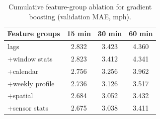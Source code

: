 \begin{table}[t]
\centering
\caption{Cumulative feature-group ablation for gradient boosting (validation MAE, mph).}
\label{tab:feat_ablation}
\begin{tabular}{lccc}
\toprule
Feature groups & 15 min & 30 min & 60 min \\
\midrule
lags & 2.832 & 3.423 & 4.360 \\
+window stats & 2.823 & 3.412 & 4.341 \\
+calendar & 2.756 & 3.256 & 3.962 \\
+weekly profile & 2.736 & 3.126 & 3.517 \\
+spatial & 2.684 & 3.052 & 3.432 \\
+sensor stats & 2.675 & 3.038 & 3.411 \\
\bottomrule
\end{tabular}
\end{table}